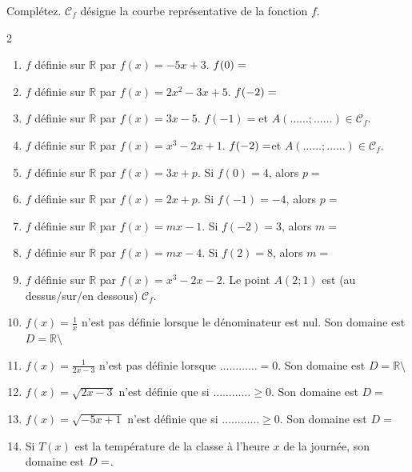 \documentclass[main.tex]{subfiles}
\begin{document}
\begin{exercise}Complétez. $\mathscr{C}_f$ désigne la courbe représentative de la fonction $f$.
	\vspace{-0.5em}
	\begin{spacing}{2} 
		\begin{enumerate}[label=\arabic*),leftmargin =*]  
			\item $f$ définie sur $\mathbb{R}$ par  $f(x)=-5x+3$. $f(0)=\dotfill $
			\item $f$ définie sur $\mathbb{R}$ par  $f(x)=2x^2-3x+5$. $f(-2)=\dotfill $
			\item $f$ définie sur $\mathbb{R}$ par $f(x)=3x-5$. $f(-1)=$\dotfill et $A(\ldots\ldots;\ldots\ldots)\in\mathscr{C}_f$.
			\item $f$ définie sur $\mathbb{R}$ par  $f(x)=x^3-2x+1$. $f(-2)=\dotfill $et $A(\ldots\ldots;\ldots\ldots)\in\mathscr{C}_f$.
			\item $f$ définie sur $\mathbb{R}$ par  $f(x)=3x+p$. Si $f(0)=4$, alors $p=$\dotfill 
			\item $f$ définie sur $\mathbb{R}$ par  $f(x)=2x+p$. Si $f(-1)=-4$, alors $p=$\dotfill 
			\item $f$ définie sur $\mathbb{R}$ par  $f(x)=mx-1$. Si $f(-2)=3$, alors $m=$\dotfill 
			\item $f$ définie sur $\mathbb{R}$ par  $f(x)=mx-4$. Si $f(2)=8$, alors $m=$\dotfill 
			\item $f$ définie sur $\mathbb{R}$ par  $f(x)=x^3-2x-2$. Le point $A(2;1)$ est (au dessus/sur/en dessous) $\mathscr{C}_f$. 
			\item $f(x)=\frac{1}{x}$ n'est pas définie lorsque le dénominateur est nul. Son domaine est $D=\mathbb{R}\setminus $\dotfill  
			\item $f(x)=\frac{1}{2x-3}$ n'est pas définie lorsque $\ldots\ldots\ldots\ldots=0$. Son domaine est $D=\mathbb{R}\setminus $\dotfill 
			\item $f(x)=\sqrt{2x-3}$ n'est définie que si $\ldots\ldots\ldots\ldots\geqslant 0$. Son domaine est $D= $\dotfill  
			\item $f(x)=\sqrt{-5x+1}$ n'est définie que si $\ldots\ldots\ldots\ldots\geqslant 0$. Son domaine est $D= $\dotfill 
			\item Si $T(x)$ est la température de la classe à l'heure $x$ de la journée, son domaine est $D=\dotfill $. 
		\end{enumerate} 
	\end{spacing}
\end{exercise}
\vspace{-2em}
\end{document}
